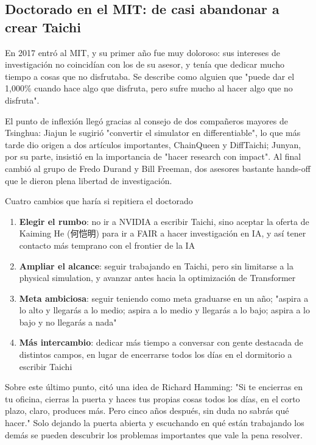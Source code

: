 \documentclass[a4paper]{article}
\begin{document}
\subsection{Doctorado en el MIT: de casi abandonar a crear Taichi}

En 2017 entró al MIT, y su primer año fue muy doloroso: sus intereses de investigación no coincidían con los de su asesor, y tenía que dedicar mucho tiempo a cosas que no disfrutaba. Se describe como alguien que "puede dar el 1,000\% cuando hace algo que disfruta, pero sufre mucho al hacer algo que no disfruta".

El punto de inflexión llegó gracias al consejo de dos compañeros mayores de Tsinghua: Jiajun le sugirió "convertir el simulator en differentiable", lo que más tarde dio origen a dos artículos importantes, ChainQueen y DiffTaichi; Junyan, por su parte, insistió en la importancia de "hacer research con impact". Al final cambió al grupo de Fredo Durand y Bill Freeman, dos asesores bastante hands-off que le dieron plena libertad de investigación.

\begin{importantbox}{Cuatro cambios que haría si repitiera el doctorado}
\begin{enumerate}
\item \textbf{Elegir el rumbo}: no ir a NVIDIA a escribir Taichi, sino aceptar la oferta de Kaiming He (何恺明) para ir a FAIR a hacer investigación en IA, y así tener contacto más temprano con el frontier de la IA
\item \textbf{Ampliar el alcance}: seguir trabajando en Taichi, pero sin limitarse a la physical simulation, y avanzar antes hacia la optimización de Transformer
\item \textbf{Meta ambiciosa}: seguir teniendo como meta graduarse en un año; "aspira a lo alto y llegarás a lo medio; aspira a lo medio y llegarás a lo bajo; aspira a lo bajo y no llegarás a nada"
\item \textbf{Más intercambio}: dedicar más tiempo a conversar con gente destacada de distintos campos, en lugar de encerrarse todos los días en el dormitorio a escribir Taichi
\end{enumerate}
\end{importantbox}

Sobre este último punto, citó una idea de Richard Hamming: "Si te encierras en tu oficina, cierras la puerta y haces tus propias cosas todos los días, en el corto plazo, claro, produces más. Pero cinco años después, sin duda no sabrás qué hacer." Solo dejando la puerta abierta y escuchando en qué están trabajando los demás se pueden descubrir los problemas importantes que vale la pena resolver.
\end{document}
